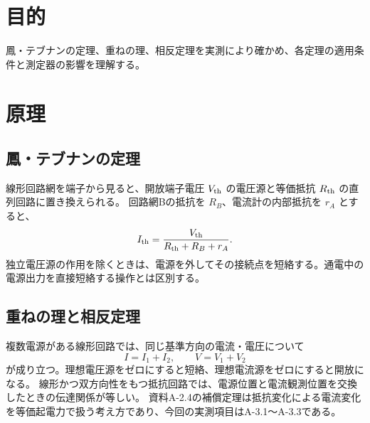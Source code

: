 \documentclass[lualatex,a4paper,10pt]{jlreq}
\begin{document}
\reporttitle
{}


\section{目的}\label{sec:auto1}
鳳・テブナンの定理、重ねの理、相反定理を実測により確かめ、各定理の適用条件と測定器の影響を理解する。
\section{原理}\label{sec:auto2}
\subsection{鳳・テブナンの定理}
線形回路網を端子から見ると、開放端子電圧 $V_{\rm th}$ の電圧源と等価抵抗 $R_{\rm th}$ の直列回路に置き換えられる。
回路網Bの抵抗を $R_B$、電流計の内部抵抗を $r_A$ とすると、
\begin{equation} I_{\rm th}=\frac{V_{\rm th}}{R_{\rm th}+R_B+r_A}.\label{eq:th}\end{equation}
独立電圧源の作用を除くときは、電源を外してその接続点を短絡する。通電中の電源出力を直接短絡する操作とは区別する。
\subsection{重ねの理と相反定理}
複数電源がある線形回路では、同じ基準方向の電流・電圧について
\begin{equation}I=I_1+I_2,\qquad V=V_1+V_2\end{equation}
が成り立つ。理想電圧源をゼロにすると短絡、理想電流源をゼロにすると開放になる。
線形かつ双方向性をもつ抵抗回路では、電源位置と電流観測位置を交換したときの伝達関係が等しい。
資料A-2.4の補償定理は抵抗変化による電流変化を等価起電力で扱う考え方であり、今回の実測項目はA-3.1〜A-3.3である。
\end{document}
